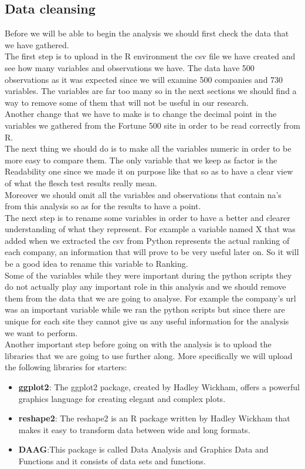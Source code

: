 \documentclass{book}
\begin{document}
\subsection{Data cleansing}
Before we will be able to begin the analysis we should first check the data that we have gathered.\\
The first step is to upload in the R environment the csv file we have created and see how many variables and observations we have. The data have 500 observations as it was expected since we will examine 500 companies and 730 variables. The variables are far too many so in the next sections we should find a way to remove some of them that will not be useful in our research.\\
Another change that we have to make is to change the decimal point in the variables we gathered from the Fortune 500 site in order to be read correctly from R.\\
The next thing we should do is to make all the variables numeric in order to be more easy to compare them. The only variable that we keep as factor is the Readability one since we made it on purpose like that so as to have a clear view of what the flesch test results really mean.\\
Moreover we should omit all the variables and observations that contain na's from this analysis so as for the results to have a point.\\
The next step is to rename some variables in order to have a better and clearer understanding of what they represent. For example a variable named X that was added when we extracted the csv from Python represents the actual ranking of each company, an information that will prove to be very useful later on. So it will be a good idea to rename this variable to Ranking.\\
Some of the variables while they were important during the python scripts they do not actually play any important role in this analysis and we should remove them from the data that we are going to analyse. For example the company's url was an important variable while we ran the python scripts but since there are unique for each site they cannot give us any useful information for the analysis we want to perform.\\
Another important step before going on with the analysis is to upload the libraries that we are going to use further along. More specifically we will upload the following libraries for starters:
\begin{itemize}
\item \textbf{ggplot2}: The ggplot2 package, created by Hadley Wickham, offers a powerful graphics language for creating elegant and complex plots.
\item \textbf{reshape2}: The reshape2 is an R package written by Hadley Wickham that makes it easy to transform data between wide and long formats.
\item \textbf{DAAG}:This package is called Data Analysis and Graphics Data and Functions and it consists of data sets and functions.
\end{itemize}
\end{document}
